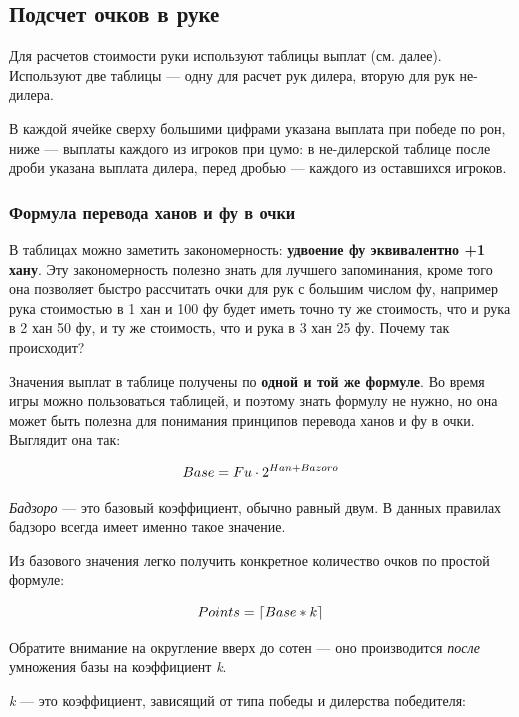 \subsection{Подсчет очков в руке}

Для расчетов стоимости руки используют таблицы выплат (см. далее). Используют две таблицы --- одну для расчет рук дилера, вторую для рук не-дилера.

В каждой ячейке сверху большими цифрами указана выплата при победе по рон, ниже --- выплаты каждого из игроков при цумо: в не-дилерской таблице после дроби указана выплата дилера, перед дробью --- каждого из оставшихся игроков.

\subsubsection{Формула перевода ханов и фу в очки}

В таблицах можно заметить закономерность: \textbf{удвоение фу эквивалентно +1 хану}. Эту закономерность полезно знать для лучшего запоминания, кроме того она позволяет быстро рассчитать очки для рук с большим числом фу, например рука стоимостью в 1 хан и 100 фу будет иметь точно ту же стоимость, что и рука в 2 хан 50 фу, и ту же стоимость, что и рука в 3 хан 25 фу. Почему так происходит?

Значения выплат в таблице получены по \textbf{одной и той же формуле}. Во время игры можно пользоваться таблицей, и поэтому знать формулу не нужно, но она может быть полезна для понимания принципов перевода ханов и фу в очки. Выглядит она так:

\begin{equation}
	\large
	Base = Fu \cdot 2 ^ {Han + Bazoro}
\end{equation}

\textit{Бадзоро} --- это базовый коэффициент, обычно равный двум. В данных правилах бадзоро всегда имеет именно такое значение.

Из базового значения легко получить конкретное количество очков по простой формуле:

\begin{equation}
	\large
	Points = \lceil Base * k \rceil
\end{equation}

Обратите внимание на округление вверх до сотен --- оно производится \textit{после} умножения базы на коэффициент \textit{k}.

\textit{k} --- это коэффициент, зависящий от типа победы и дилерства победителя:

